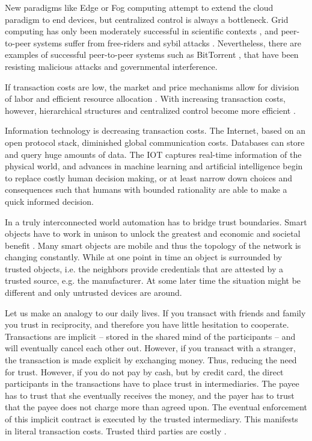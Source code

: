 New paradigms like Edge or Fog computing \parencite{Bonomi:2012:FCR:2342509.2342513,Yi:2015:SFC:2757384.2757397} attempt to extend the cloud paradigm to end devices, but centralized control is always a bottleneck. Grid computing has only been moderately successful in scientific contexts \parencite{Anderson:2002:SEP:581571.581573,Beberg2009Folding}, and peer-to-peer systems \parencite{Rodrigues:2010:PS:1831407.1831427} suffer from free-riders \parencite{10.2307/3003400} and sybil attacks \parencite{douceur2002sybil}. Nevertheless, there are examples of successful peer-to-peer systems such as BitTorrent \parencite{cohen2003incentives}, that have been resisting malicious attacks and governmental interference.

If transaction costs are low, the market and price mechanisms allow for division of labor and efficient resource allocation \parencite{smith1887inquiry}. With increasing transaction costs, however, hierarchical structures and centralized control become more efficient \parencite{ECCA:ECCA386}. 

Information technology is decreasing transaction costs. The Internet, based on an open protocol stack, diminished global communication costs. Databases can store and query huge amounts of data. The \ac{IOT} captures real-time information of the physical world, and advances in machine learning and artificial intelligence begin to replace costly human decision making, or at least narrow down choices and consequences such that humans with bounded rationality \parencite{simon1982models} are able to make a quick informed decision. 

In a truly interconnected world automation has to bridge trust boundaries. Smart objects have to work in unison to unlock the greatest and economic and societal benefit \parencite{manyika2015unlocking}.
Many smart objects are mobile and thus the topology of the network is changing constantly. While at one point in time an object is surrounded by trusted objects, i.e. the neighbors provide credentials that are attested by a trusted source, e.g. the manufacturer. At some later time the situation might be different and only untrusted devices are around. 

Let us make an analogy to our daily lives. If you transact with friends and family you trust in reciprocity, and therefore you have little hesitation to cooperate. Transactions are implicit -- stored in the shared mind of the participants -- and will eventually cancel each other out. However, if you transact with a stranger, the transaction is made explicit by exchanging money. Thus, reducing the need for trust. However, if you do not pay by cash, but by credit card, the direct participants in the transactions have to place trust in intermediaries. The payee has to trust that she eventually receives the money, and the payer has to trust that the payee does not charge more than agreed upon. The eventual enforcement of this implicit contract is executed by the trusted intermediary. This manifests in literal transaction costs. Trusted third parties are costly \parencite{szabo2005trusted}.

